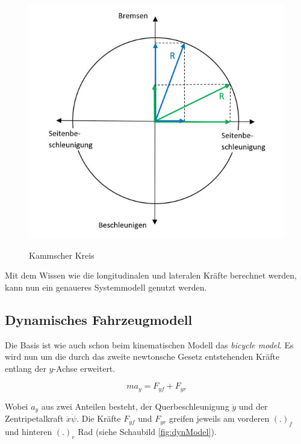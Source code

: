 \documentclass{like}
\begin{document}
\begin{figure}[ht!]
	\caption{Kammscher Kreis}
	\includegraphics[width=400pt]{Abbildungen/kamKreis.jpg}
	\label{fig:kamKreis}
\end{figure}
	
	



Mit dem Wissen wie die longitudinalen und lateralen Kräfte berechnet werden, kann nun ein genaueres Systemmodell genutzt werden.

\subsection{Dynamisches Fahrzeugmodell}
\label{dynModel}

Die Basis ist wie auch schon beim kinematischen Modell das \textit{bicycle model}. Es wird nun um die durch das zweite newtonsche Gesetz entstehenden Kräfte entlang der \(y\)-Achse erweitert.

\begin{equation}
ma_y = F_{yf} + F_{yr}
\end{equation}   


Wobei \(a_y\) aus zwei Anteilen besteht, der Querbeschleunigung \(\ddot{y}\) und der Zentripetalkraft \(\dot{x} \dot{\psi}\).  
Die Kräfte \(F_{yf}\) und \(F_{yr}\) greifen jeweils am vorderen \((.)_f\) und hinteren \((.)_r\) Rad (siehe Schaubild \ref{fig:dynModel}). 
\end{document}
